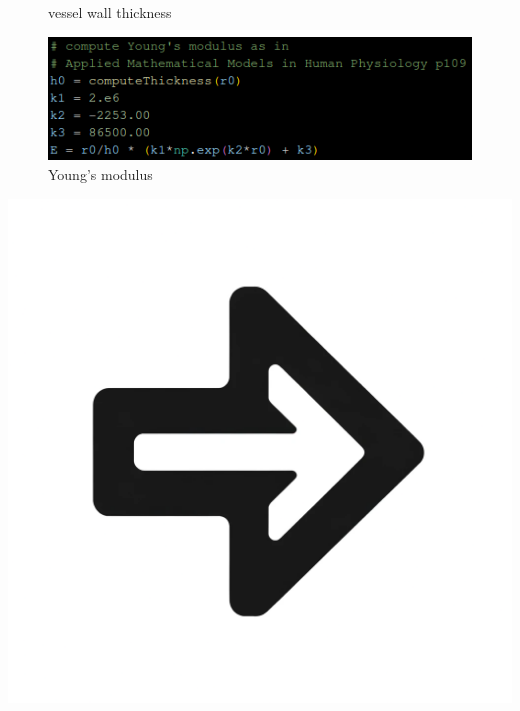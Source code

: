\documentclass{beamer}
\begin{document}
\begin{frame}
\begin{minipage}{0.25\textwidth}
\begin{figure}
			\caption*{vessel wall thickness}
			\includegraphics[width=\textwidth]{images/config3.png}
			\caption*{Young's modulus}
		\end{figure}
	\end{minipage}
	\begin{minipage}{0.1\textwidth}
		\includegraphics[width=\textwidth]{images/right_arrow.png}
	\end{minipage}
	\begin{minipage}{0.25\textwidth}
		\begin{figure}

\end{figure}
\end{minipage}
\end{frame}
\end{document}
